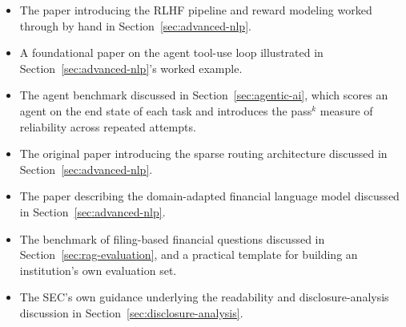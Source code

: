 \documentclass[../ai_in_finance]{subfiles}
\begin{document}
\begin{itemize}
    \item {} The paper introducing the RLHF pipeline and reward modeling worked through by hand in Section~\ref{sec:advanced-nlp}.
    \item {} A foundational paper on the agent tool-use loop illustrated in Section~\ref{sec:advanced-nlp}'s worked example.
    \item {} The agent benchmark discussed in Section~\ref{sec:agentic-ai}, which scores an agent on the end state of each task and introduces the pass$^k$ measure of reliability across repeated attempts.
    \item {} The original paper introducing the sparse routing architecture discussed in Section~\ref{sec:advanced-nlp}.
    \item {} The paper describing the domain-adapted financial language model discussed in Section~\ref{sec:advanced-nlp}.
    \item {} The benchmark of filing-based financial questions discussed in Section~\ref{sec:rag-evaluation}, and a practical template for building an institution's own evaluation set.
    \item {} The SEC's own guidance underlying the readability and disclosure-analysis discussion in Section~\ref{sec:disclosure-analysis}.
\end{itemize}
\end{document}
